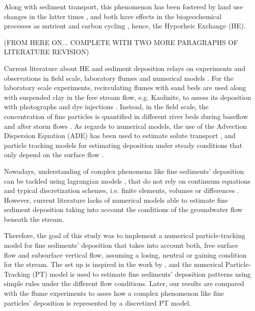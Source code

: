 \documentclass[draft,linenumbers]{agujournal2018}
\begin{document}
Along with sediment transport, this phenomenon has been fostered by land use changes in the latter times \citep{Wohl2015}, and both have effects in the biogeochemical processes as nutrient and carbon cycling \citep{Hope1994,Gottselig2014}, hence, the Hyporheic Exchange (HE).




(FROM HERE ON... COMPLETE WITH TWO MORE PARAGRAPHS OF LITERATURE REVISION)

Current literature about HE and sediment deposition relays on experiments and observations in field scale, laboratory flumes and numerical models \citep{Salehin2004a,Marion2002,Fox2014,Fox2018}. For the laboratory scale experiments, recirculating flumes with sand beds are used along with suspended clay in the free stream flow, e.g. Kaolinite, to assess its deposition with photographs and dye injections \citep{Fox2014,Fox2018}. Instead, in the field scale, the concentration of fine particles is quantified in different river beds during baseflow and after storm flows \citep{Drummond2017}. As regards to numerical models, the use of the Advection Dispersion Equation (ADE) has been used to estimate solute transport \citep{Boano2007b,BayaniCardenas2008c}, and particle tracking models for estimating deposition under steady conditions that only depend on the surface flow \citep{Packman2000}. 

Nowadays, understanding of complex phenomena like fine sediments' deposition can be tackled using lagrangian models \citep{Schumer2009}, that do not rely on continuum equations and typical discretization schemes, i.e. finite elements, volumes or differences \citep{Noetinger2016}. However, current literature lacks of numerical models able to estimate fine sediment deposition taking into account the conditions of the groundwater flow beneath the stream.

Therefore, the goal of this study was to implement a numerical particle-tracking model for fine sediments' deposition that takes into account both, free surface flow and subsurface vertical flow, assuming a losing, neutral or gaining condition for the stream. The set up is inspired in the work by \citet{Fox2014,Fox2018}, and the numerical Particle-Tracking (PT) model is used to estimate fine sediments' deposition patterns using simple rules under the different flow conditions. Later, our results are compared with the flume experiments to asses how a complex phenomenon like fine particles' deposition is represented by a discretized PT model. 
\end{document}
